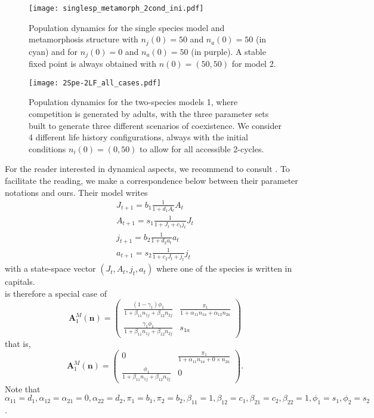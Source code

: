 \documentclass{article}
\begin{document}
\begin{figure}[H]
    \centering
    \texttt{[image: singlesp\_metamorph\_2cond\_ini.pdf]}
    \caption{Population dynamics for the single species model and metamorphosis structure with $n_{j}(0) = 50$ and $n_{a}(0) = 50$ (in cyan) and for $n_{j}(0) = 0$ and $n_{a}(0) = 50$ (in purple).  A stable fixed point is always obtained with $n(0)=(50,50)$ for model 2. }
    \label{fig:1sp_dynamics_meta}
\end{figure}

\begin{figure}[H]
    \centering
    \texttt{[image: 2Spe-2LF\_all\_cases.pdf]}
    \caption{Population dynamics for the two-species models 1, where competition is generated by adults,  with the three parameter sets built to generate three different scenarios of coexistence. We consider 4 different life history configurations, always with the initial conditions $n_i(0) = (0,50)$ to allow for all accessible 2-cycles.}
    \label{fig:2sp_dynamics}
\end{figure}
For the reader interested in dynamical aspects, we recommend to consult \citet{cushing2007coexistence}. To facilitate the reading, we make a correspondence below between their parameter notations and ours. Their model writes
\begin{equation}
\begin{split}
       J_{t+1} = b_1 \frac{1}{1+d_1A_t} A_t\\
       A_{t+1} = s_1 \frac{1}{1+ J_t + c_1 j_t} J_t\\
       j_{t+1} = b_2 \frac{1}{1+d_2 a_t} a_t\\
       a_{t+1} = s_2 \frac{1}{1+c_2 J_t + j_t} j_t
\end{split}
\end{equation}
with a state-space vector $(J_t,A_t, j_t,a_t)$ where one of the species is written in capitals. \\

\citet{cushing2007coexistence} is therefore a special case of 
\begin{equation}
    \mathbf{A}_1^{M}(\mathbf{n}) = \begin{pmatrix}
    \frac{(1-\gamma_1)\phi_1}{1+\beta_{11}n_{1j}+\beta_{12}n_{2j}} & \frac{\pi_1}{1+\alpha_{11}n_{1a}+\alpha_{12}n_{2a}} \\
    \frac{\gamma_1\phi_1}{1+\beta_{11}n_{1j}+\beta_{12}n_{2j}} & s_{1a}
    \end{pmatrix}\label{eq:MB_model}
\end{equation}
that is,
\begin{equation}
    \mathbf{A}_1^{M}(\mathbf{n}) = \begin{pmatrix}
    0 & \frac{\pi_1}{1+\alpha_{11}n_{1a}+0 \times n_{2a}} \\
    \frac{\phi_1}{1+\beta_{11}n_{1j}+\beta_{12}n_{2j}} & 0
    \end{pmatrix}.\label{eq:MB_model}
\end{equation}
Note that $\alpha_{11} = d_1, \alpha_{12} = \alpha_{21} = 0, \alpha_{22} = d_2, \pi_1 = b_1, \pi_2 = b_2, \beta_{11} = 1, \beta_{12} = c_1, \beta_{21} = c_2, \beta_{22} = 1, \phi_1 = s_1,\phi_2 = s_2$.  
\end{document}
